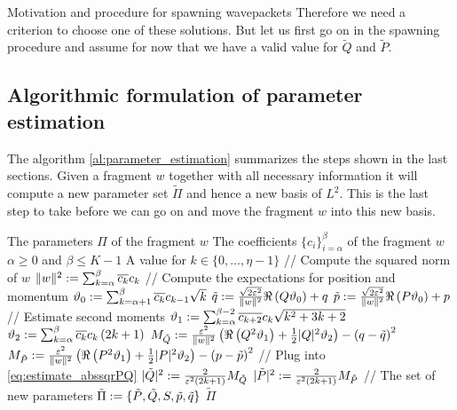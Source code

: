 \begin{chapter}{Motivation and procedure for spawning wavepackets}
Therefore we need a criterion to choose one of these solutions. But let us first
go on in the spawning procedure and assume for now that we have a valid value
for $\tilde{Q}$ and $\tilde{P}$.


\subsection{Algorithmic formulation of parameter estimation}

The algorithm \ref{al:parameter_estimation} summarizes the steps shown in the last
sections. Given a fragment $w$ together with all necessary information it will
compute a new parameter set $\tilde{\Pi}$ and hence a new basis of $L^2$. This
is the last step to take before we can go on and move the fragment $w$ into
this new basis.

\begin{algorithm}
\caption{Parameter estimation for fragments}
\label{al:parameter_estimation}
\begin{algorithmic}
  \REQUIRE The parameters $\Pi$ of the fragment $w$
  \REQUIRE The coefficients $\{c_i\}_{i=\alpha}^{\beta}$ of the fragment $w$
  \REQUIRE $\alpha \geq 0$ and $\beta \leq K-1$
  \REQUIRE A value for $k \in \{0, \ldots, \eta-1\}$
  \STATE // Compute the squared norm of $w$
  \STATE $\|w\|^2 := \sum_{k=\alpha}^\beta \overline{c_k} c_k$
  \STATE // Compute the expectations for position and momentum
  \STATE $\vartheta_0 := \sum_{k=\alpha+1}^\beta \overline{c_k} c_{k-1} \sqrt{k}$
  \STATE $\tilde{q} := \frac{\sqrt{2 \varepsilon^2}}{\|w\|^2} \Re \left(Q \vartheta_0 \right) + q$
  \STATE $\tilde{p} := \frac{\sqrt{2 \varepsilon^2}}{\|w\|^2} \Re \left(P \vartheta_0 \right) + p$
  \STATE // Estimate second moments
  \STATE $\vartheta_1 := \sum_{k=\alpha}^{\beta-2} \overline{c_{k+2}} c_{k} \sqrt{k^2+3k+2}$
  \STATE $\vartheta_2 := \sum_{k=\alpha}^\beta \overline{c_k} c_k \left(2k+1\right)$
  \STATE $M_{\tilde{Q}} := \frac{\varepsilon^2}{\|w\|^2} \left(
          \Re \left( Q^2 \vartheta_1 \right) + \frac{1}{2} |Q|^2 \vartheta_2 \right)
          - \left(q - \tilde{q}\right)^2$
  \STATE $M_{\tilde{P}} := \frac{\varepsilon^2}{\|w\|^2} \left(
          \Re \left( P^2 \vartheta_1 \right) + \frac{1}{2} |P|^2 \vartheta_2 \right)
          - \left(p - \tilde{p}\right)^2$
  \STATE // Plug into \eqref{eq:estimate_abssqrPQ}
  \STATE $|\tilde{Q}|^2 := \frac{2}{\varepsilon^2 \left(2k + 1\right)} M_{\tilde{Q}} $
  \STATE $|\tilde{P}|^2 := \frac{2}{\varepsilon^2 \left(2k + 1\right)} M_{\tilde{P}} $
  \STATE // The set of new parameters 
  \STATE $\tilde{\Pi} := \{\tilde{P}, \tilde{Q}, S, \tilde{p}, \tilde{q}\}$
  \RETURN $\tilde{\Pi}$
\end{algorithmic}
\end{algorithm}



\end{chapter}
